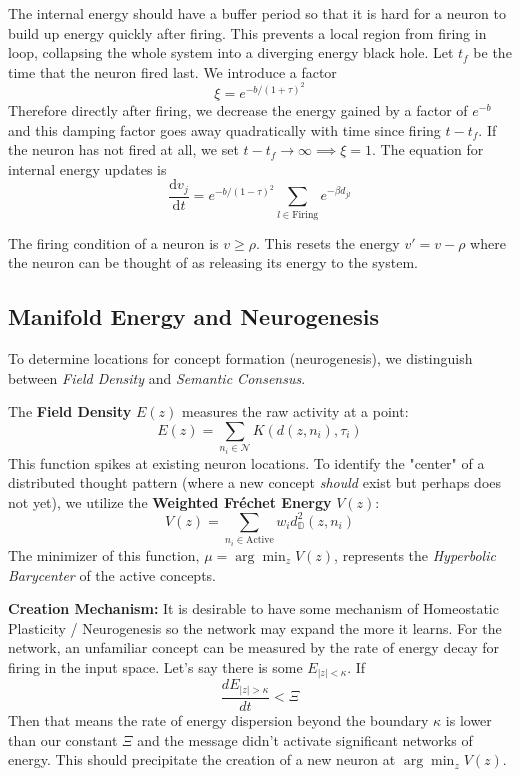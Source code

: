 \documentclass{article}
\newcommand{\D}{\mathrm{d}}
\begin{document}
The internal energy should have a buffer period so that it is hard for a neuron to build up energy quickly after firing. This prevents a local region from firing in loop, collapsing the whole system into a diverging energy black hole. Let $t_f$ be the time that the neuron fired last. We introduce a factor
\begin{equation}
    \xi = e^{-b/(1+\tau)^2}
\end{equation}
Therefore directly after firing, we decrease the energy gained by a factor of $e^{-b}$ and this damping factor goes away quadratically with time since firing $t-t_f$. If the neuron has not fired at all, we set $t-t_f \to \infty \implies \xi = 1$. The equation for internal energy updates is 
\begin{equation}
    \frac{\D v_j}{\D t} = e^{-b/(1-\tau)^2}\sum_{l \in \mathrm{Firing}} e^{-\beta d_{jl}}
\end{equation}

The firing condition of a neuron is $v \ge \rho$. This resets the energy $v' = v-\rho$ where the neuron can be thought of as releasing its energy to the system.



\subsection{Manifold Energy and Neurogenesis}
To determine locations for concept formation (neurogenesis), we distinguish between \textit{Field Density} and \textit{Semantic Consensus}.

The \textbf{Field Density} $E(z)$ measures the raw activity at a point:
\begin{equation}
    E(z) = \sum_{n_i \in \mathcal{N}} K(d(z,n_i), \tau_i)
\end{equation}
This function spikes at existing neuron locations. To identify the "center" of a distributed thought pattern (where a new concept \textit{should} exist but perhaps does not yet), we utilize the \textbf{Weighted Fréchet Energy} $V(z)$:
\begin{equation}
    V(z) = \sum_{n_i \in \text{Active}} w_i d_{\mathbb{D}}^2(z, n_i)
\end{equation}
The minimizer of this function, $\mu = \arg\min_z V(z)$, represents the \textit{Hyperbolic Barycenter} of the active concepts. 

\textbf{Creation Mechanism:} It is desirable to have some mechanism of Homeostatic Plasticity / Neurogenesis so the network may expand the more it learns. For the network, an unfamiliar concept can be measured by the rate of energy decay for firing in the input space. Let's say there is some $E_{|z| < \kappa}$. If 
\begin{equation}
    \frac{dE_{|z|>\kappa}}{dt} < \Xi
\end{equation}
Then that means the rate of energy dispersion beyond the boundary $\kappa$ is lower than our constant $\Xi$ and the message didn't activate significant networks of energy. This should precipitate the creation of a new neuron at $\arg\min_z V(z)$. \\
\end{document}
